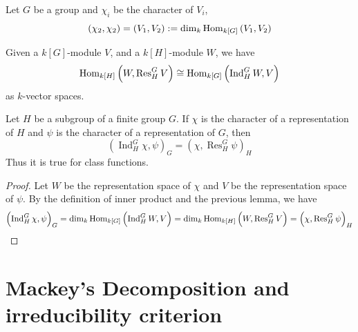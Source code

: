 \documentclass[12pt, oneside]{book}
\begin{document}
\begin{lemma}
    Let $G$ be a group and $\chi_i$ be the character of $V_i$,
    \begin{equation*}
        \left(\chi_2 , \chi_2 \right)
        =
        \left(V_1,V_2 \right)
        :=
        \dim_k \operatorname{\operatorname{Hom}}_{k[G]}\left( V_1 ,V_2 \right)
    \end{equation*}
\end{lemma}


\begin{theorem}
    Given a $k[G]$-module $V$, and a $k[H]$-module $W$, we have
    \begin{equation*}
        \operatorname{\operatorname{Hom}}_{k[H]}\left(W  ,\operatorname{Res}_H^G V \right)
        \cong \operatorname{\operatorname{Hom}}_{k[G]}\left( \operatorname{Ind}_H^G W , V \right)
    \end{equation*}
    as $k$-vector spaces.
\end{theorem}

\begin{theorem}
    Let $H$ be a subgroup of a finite group $G$.
    If $\chi$ is the character of a representation of $H$ and $\psi$ is the character of a representation of $G$, then
    \begin{equation*}
        \left(\operatorname{Ind}_H^G \chi ,\psi \right)_G
        =
        \left(\chi ,\operatorname{Res}_H^G \psi \right)_H
    \end{equation*}
    Thus it is true for class functions.
    \begin{proof}
        Let $W$ be the representation space of $\chi$ and $V$ be the representation space of $\psi$.
        By the definition of inner product and the previous lemma, we have
        \begin{equation*}
            \left(\operatorname{Ind}_H^G \chi ,\psi \right)_G
            =
            \dim_k \operatorname{\operatorname{Hom}}_{k[G]}\left( \operatorname{Ind}_H^G W ,V \right)
            =
            \dim_k \operatorname{\operatorname{Hom}}_{k[H]}\left( W ,\operatorname{Res}_H^G V \right)
            =
            \left(\chi ,\operatorname{Res}_H^G \psi \right)_H
        \end{equation*}
    \end{proof}
\end{theorem}

\section{Mackey's Decomposition and irreducibility criterion}
\end{document}
